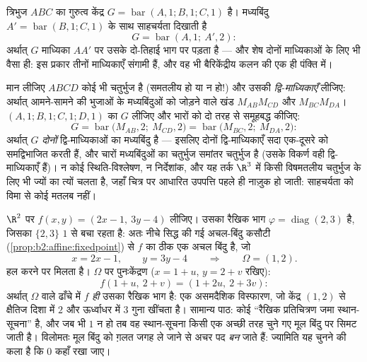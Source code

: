 \begin{example}[क्लासिक बैरिकेंद्रीय ज्यामिति]\label{ex:b2:affine:median}
त्रिभुज $ABC$ का गुरुत्व केंद्र  $G =
\operatorname{bar}(A,1; B,1; C,1)$ है। मध्यबिंदु $A' = \operatorname{bar}(B, 1; C, 1)$ के साथ
साहचर्यता दिखाती है
\[
G = \operatorname{bar}(A, 1;\ A', 2) :
\]
अर्थात् $G$ माध्यिका $AA'$ पर उसके दो-तिहाई भाग पर पड़ता है --- और शेष दोनों
माध्यिकाओं के लिए भी वैसा ही: इस प्रकार तीनों माध्यिकाएँ संगामी हैं, और वह
भी बैरिकेंद्रीय कलन की एक ही पंक्ति में।
\end{example}

\begin{example}[किसी चतुर्भुज की द्वि-माध्यिकाएँ]\label{ex:b2:affine:bimedians}
मान लीजिए $ABCD$ कोई भी चतुर्भुज है (समतलीय हो या न हो!) और उसकी
\emph{द्वि-माध्यिकाएँ} लीजिए: अर्थात् आमने-सामने की भुजाओं के मध्यबिंदुओं
को जोड़ने वाले खंड $M_{AB}M_{CD}$ और $M_{BC}M_{DA}$। $(A,1; B,1; C,1; D,1)$ का  $G$ लीजिए और भारों को दो
तरह से समूहबद्ध कीजिए:
\[
G = \operatorname{bar}\bigl(M_{AB}, 2;\ M_{CD}, 2\bigr)
= \operatorname{bar}\bigl(M_{BC}, 2;\ M_{DA}, 2\bigr) :
\]
अर्थात् $G$ \emph{दोनों} द्वि-माध्यिकाओं का मध्यबिंदु है --- इसलिए दोनों
द्वि-माध्यिकाएँ सदा एक-दूसरे को समद्विभाजित करती हैं, और चारों मध्यबिंदुओं
का चतुर्भुज समांतर चतुर्भुज है (उसके विकर्ण वही द्वि-माध्यिकाएँ हैं)। न
कोई स्थिति-विश्लेषण, न निर्देशांक, और यह तर्क $\R^3$ में किसी विषमतलीय चतुर्भुज
के लिए भी ज्यों का त्यों चलता है, जहाँ चित्र पर आधारित उपपत्ति पहले ही
नाज़ुक हो जाती: साहचर्यता को विमा से कोई मतलब नहीं।
\end{example}

\begin{example}\label{ex:b2:affine:dilation}
$\R^2$ पर $f(x, y) = (2x - 1,\ 3y - 4)$ लीजिए। उसका रैखिक भाग $\varphi = \operatorname{diag}(2, 3)$ है, जिसका  $\{2, 3\}$ $1$ से बचा
रहता है: अतः नीचे सिद्ध की गई अचल-बिंदु कसौटी (\cref{prop:b2:affine:fixedpoint}) से $f$ का ठीक एक अचल
बिंदु है, जो
\[
x = 2x - 1, \qquad y = 3y - 4
\qquad\Longrightarrow\qquad \Omega = (1, 2).
\]
हल करने पर मिलता है। $\Omega$ पर पुनःकेंद्रण ($x = 1 + u$, $y = 2 + v$ रखिए):
\[
f(1 + u,\ 2 + v) = (1 + 2u,\ 2 + 3v) :
\]
अर्थात् $\Omega$ वाले ढाँचे में $f$ \emph{ही} उसका रैखिक भाग है: एक असमदैशिक
विस्फारण, जो केंद्र $(1, 2)$ से क्षैतिज दिशा में $2$ और ऊर्ध्वाधर में $3$
गुना खींचता है। सामान्य पाठ: कोई  ``रैखिक प्रतिचित्रण जमा
स्थान-सूचना'' है, और जब भी $1$  न हो तब वह स्थान-सूचना किसी
एक अच्छी तरह चुने गए मूल बिंदु पर सिमट जाती है। विलोमतः मूल बिंदु को ग़लत
जगह ले जाने से अचर पद \emph{बन} जाते हैं:  ज्यामिति यह चुनने की कला है
कि $0$ कहाँ रखा जाए।
\end{example}

